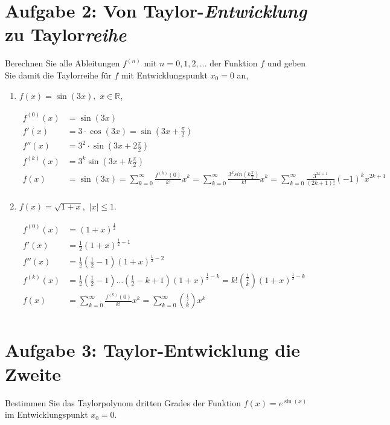 \documentclass[11pt,a4paper, parskip=half ]{report}
\begin{document}
  \section*{Aufgabe 2: Von Taylor-\textit{Entwicklung} zu Taylor\textit{reihe}}
  Berechnen Sie alle Ableitungen $f^{(n)}$ mit $n = 0, 1, 2, ...$ der Funktion $f$ und geben Sie damit die Taylorreihe für $f$ mit Entwicklungspunkt $x_0 = 0$ an,  
  \begin{enumerate}
    \item $f(x) = \sin(3x), \,\, x \in \mathbb{R}$, 
    
    \vspace{20pt}
    \begin{align*}
    f^{(0)}(x) &= \sin(3x) \\
    f'(x) &= 3 \cdot \cos(3x) = \sin(3x + \frac{\pi}{2}) \\
    f''(x) &= 3^2 \cdot \sin(3x + 2 \frac{\pi}{2}) \\
    f^{(k)}(x) &= 3^k \sin(3x + k \frac{\pi}{2}) \\
    f(x) &= \sin(3x) = \sum_{k = 0}^{\infty} \frac{f^{(k)}(0)}{k!} x^k = \sum_{k = 0}^{\infty} \frac{3^k sin(k \frac{\pi}{2})}{k!} x^k = \sum_{k = 0}^{\infty} \frac{3^{2k+1}}{(2k+1)!} (-1)^k x^{2k+1} \\
    \end{align*}

    \item $f(x) = \sqrt{1+x}, \,\,|x| \leq 1$.
    
    \vspace{20pt}
    \begin{align*}
    f^{(0)}(x) &= (1+x)^{\frac{1}{2}} \\
    f'(x) &= \frac{1}{2} (1+x)^{\frac{1}{2} -1} \\
    f''(x) &= \frac{1}{2} \left(\frac{1}{2} -1\right) (1+x)^{\frac{1}{2} -2} \\
    f^{(k)}(x) &= \frac{1}{2} \left(\frac{1}{2} -1\right) \dots \left(\frac{1}{2} - k + 1\right) (1+x)^{\frac{1}{2} - k} = k! {\frac{1}{2}\choose k} (1 + x)^{\frac{1}{2} - k}\\
    f(x) &= \sum_{k=0}^{\infty} \frac{f^{(k)}(0)}{k!} x^k = \sum_{k=0}^{\infty} {\frac{1}{2}\choose k} x^k \\
    \end{align*}

  \end{enumerate}

  \section*{Aufgabe 3: Taylor-Entwicklung die Zweite}
  Bestimmen Sie das Taylorpolynom dritten Grades der Funktion $f(x) = e^{\sin(x)}$ im Entwicklungspunkt $x_0 = 0$.  
  
\end{document}
